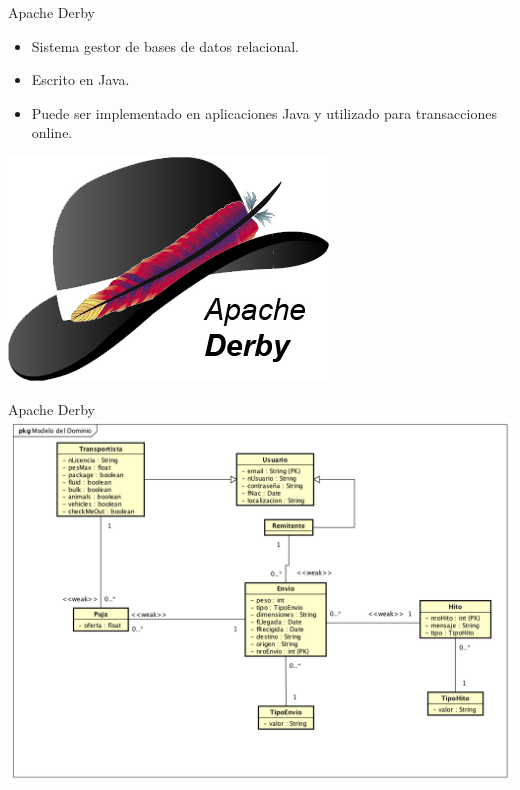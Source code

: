 \documentclass{beamer}
\begin{document}
            \begin{frame}{Apache Derby}
                \begin{minipage}{0.70\textwidth}
                    \begin{itemize}
                        \item Sistema gestor de bases de datos relacional.
                        \item Escrito en Java.
                        \item Puede ser implementado en aplicaciones Java y utilizado para transacciones online.
                    \end{itemize}
                \end{minipage}
                \begin{minipage}{0.25\textwidth}
                    \includegraphics[width=\textwidth]{res/logo-derby}
                \end{minipage}
            \end{frame}

            \begin{frame}{Apache Derby}
                \includegraphics[width=\textwidth]{astah/entidad_relacion}
            \end{frame}
\end{document}
